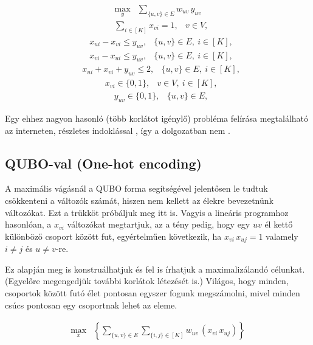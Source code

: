 \begin{align} \max _{y} &\sum _{\{{u,v}\} \in E} w_{uv} \, y_{uv}  \end{align}
\begin{align} &\sum _{i \in [K]} x_{vi} = 1,&v \in V, \label{sumMaxKCutLPEachNodeInOnePartition} \end{align}
\begin{align}&x_{ui} - x_{vi} \le y_{uv},&\{{u,v}\} \in E, \ i\in [K], \label{MaxKCutLP1} \end{align}
\begin{align}&x_{vi} - x_{ui} \le y_{uv},&\{{u,v}\} \in E, \ i\in [K], \end{align}
\begin{align}&x_{ui} + x_{vi} + y_{uv} \le 2,&\{{u,v}\} \in E, \ i\in [K], \label{MaxKCutLP3} \end{align}
\begin{align}&x_{vi} \in \{{0,1}\} ,&v \in V, \ i\in [K],\end{align}
\begin{align}&y_{uv} \in \{{0,1}\} ,&\{{u,v}\} \in E, \label{MaxKCutLP5} \end{align}

Egy ehhez nagyon hasonló (több korlátot igénylő) probléma felírása megtalálható az interneten, részletes indoklással \cite{Hojny2021}, így a dolgozatban nem . 

\subsection{QUBO-val (One-hot encoding)}\label{sec:QUBOonehot}


A maximális vágásnál a QUBO forma segítségével jelentősen le tudtuk csökkenteni a változók számát, hiszen nem kellett az élekre bevezetnünk változókat. Ezt a trükköt próbáljuk meg itt is.
Vagyis a lineáris programhoz hasonlóan, a $x_{vi}$ változókat megtartjuk, az a tény pedig, hogy egy $uv$ él kettő különböző csoport között fut, egyértelműen következik, ha $x_{vi} \, x_{uj}=1$ valamely $i \neq j$ és $u \neq v$-re.

Ez alapján meg is konstruálhatjuk és fel is írhatjuk a maximalizálandó célunkat. (Egyelőre megengedjük további korlátok létezését is.) Világos, hogy minden, csoportok között futó élet pontosan egyszer fogunk megszámolni, mivel minden csúcs pontosan egy csoportnak lehet az eleme.

\begin{align}
	 \max_{x} & \left\{ \sum _{\{{u,v}\} \in E}  \sum _{\{{i,j}\} \in [K]} w_{uv}\,(x_{vi} \, x_{uj}) \right\}
\end{align}


